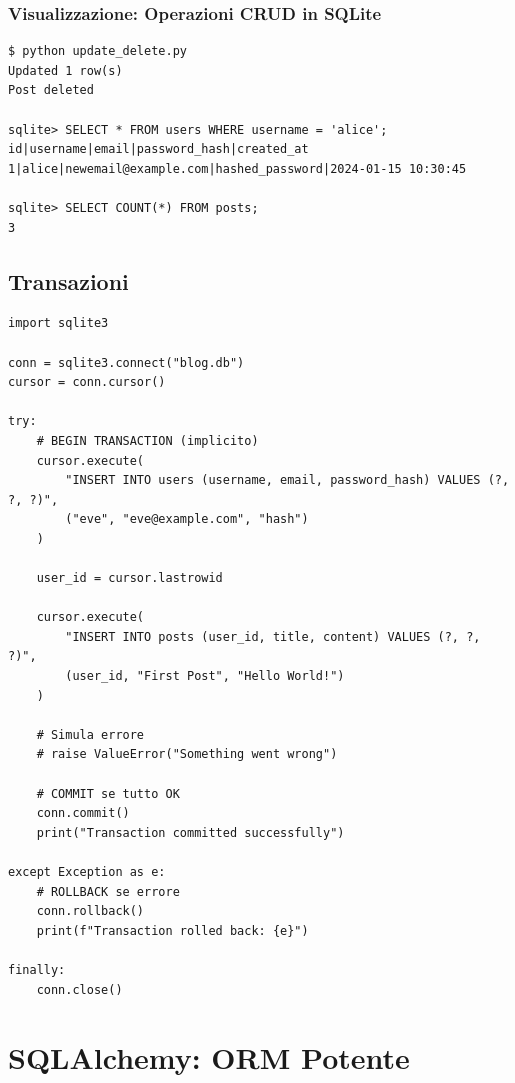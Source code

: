\subsubsection{Visualizzazione: Operazioni CRUD in SQLite}

\begin{tcolorbox}[colback=black!5, colframe=black!75, title=Esempi UPDATE e DELETE, fonttitle=\bfseries\ttfamily]
\begin{verbatim}
$ python update_delete.py
Updated 1 row(s)
Post deleted

sqlite> SELECT * FROM users WHERE username = 'alice';
id|username|email|password_hash|created_at
1|alice|newemail@example.com|hashed_password|2024-01-15 10:30:45

sqlite> SELECT COUNT(*) FROM posts;
3
\end{verbatim}
\end{tcolorbox}

\subsection{Transazioni}

\begin{lstlisting}
import sqlite3

conn = sqlite3.connect("blog.db")
cursor = conn.cursor()

try:
    # BEGIN TRANSACTION (implicito)
    cursor.execute(
        "INSERT INTO users (username, email, password_hash) VALUES (?, ?, ?)",
        ("eve", "eve@example.com", "hash")
    )

    user_id = cursor.lastrowid

    cursor.execute(
        "INSERT INTO posts (user_id, title, content) VALUES (?, ?, ?)",
        (user_id, "First Post", "Hello World!")
    )

    # Simula errore
    # raise ValueError("Something went wrong")

    # COMMIT se tutto OK
    conn.commit()
    print("Transaction committed successfully")

except Exception as e:
    # ROLLBACK se errore
    conn.rollback()
    print(f"Transaction rolled back: {e}")

finally:
    conn.close()
\end{lstlisting}

\section{SQLAlchemy: ORM Potente}

